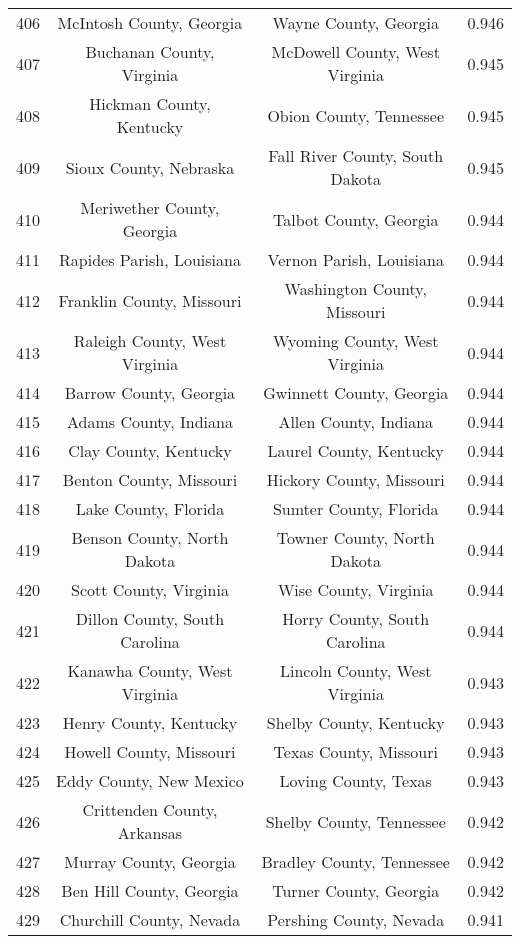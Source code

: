 \begin{longtable}{cccc}
  406 & McIntosh County, Georgia & Wayne County, Georgia & 0.946 \\ 
  407 & Buchanan County, Virginia & McDowell County, West Virginia & 0.945 \\ 
  408 & Hickman County, Kentucky & Obion County, Tennessee & 0.945 \\ 
  409 & Sioux County, Nebraska & Fall River County, South Dakota & 0.945 \\ 
  410 & Meriwether County, Georgia & Talbot County, Georgia & 0.944 \\ 
  411 & Rapides Parish, Louisiana & Vernon Parish, Louisiana & 0.944 \\ 
  412 & Franklin County, Missouri & Washington County, Missouri & 0.944 \\ 
  413 & Raleigh County, West Virginia & Wyoming County, West Virginia & 0.944 \\ 
  414 & Barrow County, Georgia & Gwinnett County, Georgia & 0.944 \\ 
  415 & Adams County, Indiana & Allen County, Indiana & 0.944 \\ 
  416 & Clay County, Kentucky & Laurel County, Kentucky & 0.944 \\ 
  417 & Benton County, Missouri & Hickory County, Missouri & 0.944 \\ 
  418 & Lake County, Florida & Sumter County, Florida & 0.944 \\ 
  419 & Benson County, North Dakota & Towner County, North Dakota & 0.944 \\ 
  420 & Scott County, Virginia & Wise County, Virginia & 0.944 \\ 
  421 & Dillon County, South Carolina & Horry County, South Carolina & 0.944 \\ 
  422 & Kanawha County, West Virginia & Lincoln County, West Virginia & 0.943 \\ 
  423 & Henry County, Kentucky & Shelby County, Kentucky & 0.943 \\ 
  424 & Howell County, Missouri & Texas County, Missouri & 0.943 \\ 
  425 & Eddy County, New Mexico & Loving County, Texas & 0.943 \\ 
  426 & Crittenden County, Arkansas & Shelby County, Tennessee & 0.942 \\ 
  427 & Murray County, Georgia & Bradley County, Tennessee & 0.942 \\ 
  428 & Ben Hill County, Georgia & Turner County, Georgia & 0.942 \\ 
  429 & Churchill County, Nevada & Pershing County, Nevada & 0.941 \\ 

\end{longtable}
